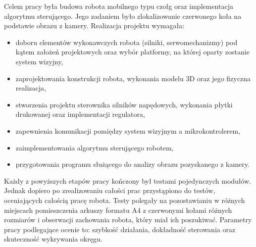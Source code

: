 Celem pracy była budowa robota mobilnego typu czołg oraz implementacja algorytmu sterującego. Jego zadaniem było zlokalizowanie czerwonego koła na podstawie obrazu z kamery. Realizacja projektu wymagała:
\begin{itemize}
\item doboru elementów wykonawczych robota (silniki, serwomechanizmy) pod kątem założeń projektowych oraz wybór platformy, na której oparty zostanie system wizyjny,
\item zaprojektowania konstrukcji robota, wykonania modelu 3D oraz jego fizyczna realizacja,
\item stworzenia projektu sterownika silników napędowych, wykonania płytki drukowanej oraz implementacji regulatora,
\item zapewnienia komunikacji pomiędzy system wizyjnym a mikrokontrolerem,
\item zaimplementowania algorytmu sterującego robotem,
\item przygotowania programu służącego do analizy obrazu pozyskanego z kamery.
\end{itemize}

Każdy z powyższych etapów pracy kończony był testami pojedynczych modułów. Jednak dopiero po zrealizowaniu całości prac przystąpiono do testów, oceniających całością pracę robota. Testy polegały na pozostawianiu w różnych miejscach pomieszczenia arkuszy formatu A4 z czerwonymi kołami różnych rozmiarów i obserwacji zachowania robota, który miał ich poszukiwać. Parametry pracy podlegające ocenie to: szybkość działania, dokładność sterowania oraz skuteczność wykrywania okręgu.






